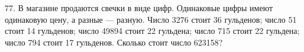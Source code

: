 77. В магазине продаются свечки в виде цифр. Одинаковые цифры имеют одинаковую цену, а разные --- разную. Число 3276 стоит 36 гульденов; число 51 стоит 14 гульденов; число 49894 стоит 22 гульдена; число 715 стоит 22 гульдена; число 794 стоит 17 гульденов. Сколько стоит число 623158?\\

